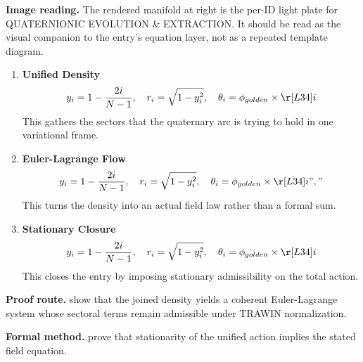 \begin{samepage}
\noindent\begin{minipage}[t]{0.45\linewidth}
\vspace{0pt}
\raggedright
\scriptsize\textbf{Image reading.} The rendered manifold at right is the per-ID light plate for QUATERNIONIC EVOLUTION \& EXTRACTION. It should be read as the visual companion to the entry's equation layer, not as a repeated template diagram.\par
\end{minipage}\hfill
\begin{minipage}[t]{0.53\linewidth}
\vspace*{-0.10in}
\raggedright
{}
\end{minipage}
\end{samepage}

\clearpage


\begin{enumerate}[leftmargin=1.6em,itemsep=9pt,topsep=6pt]
\item \textbf{Unified Density}
\[
y_i = 1 - \frac{2i}{N-1}, \quad r_i = \sqrt{1 - y_i^2}, \quad \theta_i = \phi_{golden} \times\r [L34] i
\]
This gathers the sectors that the quaternary arc is trying to hold in one variational frame.

\item \textbf{Euler-Lagrange Flow}
\[
y_i = 1 - \frac{2i}{N-1}, \quad r_i = \sqrt{1 - y_i^2}, \quad \theta_i = \phi_{golden} \times\r [L34] i","
\]
This turns the density into an actual field law rather than a formal sum.

\item \textbf{Stationary Closure}
\[
y_i = 1 - \frac{2i}{N-1}, \quad r_i = \sqrt{1 - y_i^2}, \quad \theta_i = \phi_{golden} \times\r [L34] i
\]
This closes the entry by imposing stationary admissibility on the total action.
\end{enumerate}

\textbf{Proof route.} show that the joined density yields a coherent Euler-Lagrange system whose sectoral terms remain admissible under TRAWIN normalization.

\textbf{Formal method.} prove that stationarity of the unified action implies the stated field equation.

\medskip
{}


